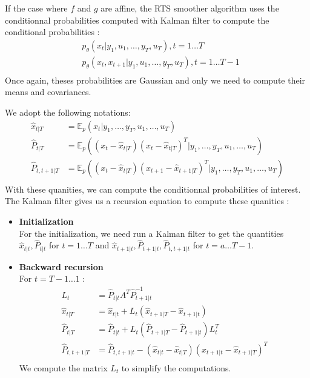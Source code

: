 If the case where $f$ and $g$ are affine, the RTS smoother algorithm uses the conditionnal probabilities computed with Kalman filter to compute the conditional probabilities :
\begin{align*}
  &p_{\theta}\left(x_t|y_1, u_1, \ldots, y_T, u_T \right ), t=1 \ldots T\\
  &p_{\theta}\left(x_t, x_{t+1}|y_1, u_1, \ldots, y_T, u_T \right ), t=1 \ldots T-1\\
\end{align*}
Once again, theses probabilities are Gaussian and only we need to compute their means and covariances.

We adopt the following notations:
\begin{align*}
  \hat{x}_{t|T} &= \mathbb{E}_p(x_t|y_1, \ldots , y_T, u_1, \ldots , u_T) \\
  \hat{P}_{t|T} &= \mathbb{E}_p \left ((x_t - \hat{x}_{t|T})(x_t - \hat{x}_{t|T})^T|y_1, \ldots , y_T, u_1, \ldots , u_T \right ) \\
  \hat{P}_{t,t+1|T} &= \mathbb{E}_p \left ((x_t - \hat{x}_{t|T})(x_{t+1} - \hat{x}_{t+1|T})^T|y_1, \ldots , y_T, u_1, \ldots , u_T \right ) \\
\end{align*}
With these quanities, we can compute the conditionnal probabilities of interest.
The Kalman filter gives us a recursion equation to compute these quanities :
\begin{itemize}
  \item \textbf{Initialization}\\
    For the initialization, we need run a Kalman filter to get the quantities $\hat{x}_{t|t}, \hat{P}_{t|t}$ for $t=1 \ldots T$ and $\hat{x}_{t+1|t}, \hat{P}_{t+1|t}, \hat{P}_{t,t+1|t}$ for $t=a \ldots T-1$.
  \item \textbf{Backward recursion}\\
    For $t=T-1 \ldots 1$ :
    \begin{align*}
      L_t &= \hat{P}_{t|t}A^T\hat{P}_{t+1|t}^{-1}\\
      \hat{x}_{t|T} &= \hat{x}_{t|t} + L_t(\hat{x}_{t+1|T} - \hat{x}_{t+1|t})\\
      \hat{P}_{t|T} &= \hat{P}_{t|t} + L_t(\hat{P}_{t+1|T} - \hat{P}_{t+1|t})L_t^T\\
      \hat{P}_{t,t+1|T} &= \hat{P}_{t,t+1|t} - (\hat{x}_{t|t} - \hat{x}_{t|T})(\hat{x}_{t+1|t} - \hat{x}_{t+1|T})^T\\
    \end{align*}
    We compute the matrix $L_{t}$ to simplify the computations.
\end{itemize}

